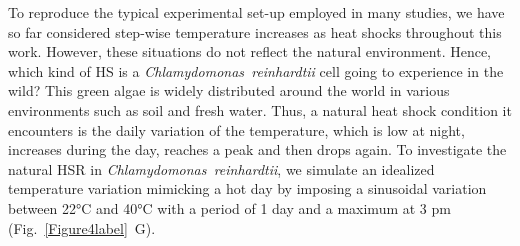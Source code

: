 \documentclass[oneside, 10pt, a4paper, twocolumn]{article}
\begin{document}


To reproduce the typical experimental set-up employed in many studies, we have so far considered step-wise temperature increases as heat shocks throughout this work. %
However, these situations do not reflect the natural environment.
Hence, which kind of HS is a \emph{Chlamydomonas~reinhardtii} cell going to experience in the wild? %
This green algae is widely distributed around the world in various environments such as soil and fresh water. 
Thus, a natural heat shock condition it encounters is the daily variation of the temperature, which is low at night, increases during the day, reaches a peak and then drops again.
To investigate the natural HSR in \emph{Chlamydomonas~reinhardtii}, we  simulate an idealized temperature variation mimicking  a hot day by imposing a sinusoidal variation between 22°C and 40°C with a period of 1 day and a maximum at 3 pm (Fig.~\ref{Figure4label}~G). 
\end{document}
